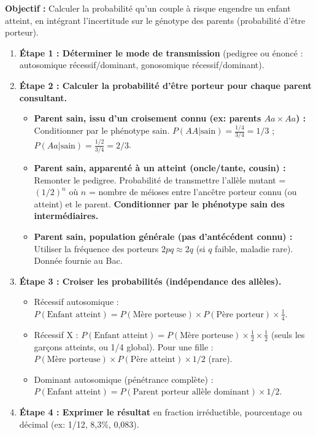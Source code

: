 \documentclass[11pt]{article}
\begin{document}
\begin{methode}
    \textbf{Objectif :} Calculer la probabilité qu'un couple à risque engendre un enfant atteint, en intégrant l'incertitude sur le génotype des parents (probabilité d'être porteur).
    \begin{enumerate}
        \item \textbf{Étape 1 : Déterminer le mode de transmission} (pedigree ou énoncé : autosomique récessif/dominant, gonosomique récessif/dominant).
        \item \textbf{Étape 2 : Calculer la probabilité d'être porteur pour chaque parent consultant.}
              \begin{itemize}
                  \item \textbf{Parent sain, issu d'un croisement connu (ex: parents $Aa \times Aa$) :} Conditionner par le phénotype sain.
                      $P(AA | \text{sain}) = \frac{1/4}{3/4} = 1/3$ ; $P(Aa | \text{sain}) = \frac{1/2}{3/4} = 2/3$.
                  \item \textbf{Parent sain, apparenté à un atteint (oncle/tante, cousin) :} Remonter le pedigree. Probabilité de transmettre l'allèle mutant = $(1/2)^n$ où $n$ = nombre de méioses entre l'ancêtre porteur connu (ou atteint) et le parent. \textbf{Conditionner par le phénotype sain des intermédiaires.}
                  \item \textbf{Parent sain, population générale (pas d'antécédent connu) :} Utiliser la fréquence des porteurs $2pq \approx 2q$ (si $q$ faible, maladie rare). Donnée fournie au Bac.
              \end{itemize}
        \item \textbf{Étape 3 : Croiser les probabilités (indépendance des allèles).}
              \begin{itemize}
                  \item Récessif autosomique : $P(\text{Enfant atteint}) = P(\text{Mère porteuse}) \times P(\text{Père porteur}) \times \frac{1}{4}$.
                  \item Récessif X : $P(\text{Enfant atteint}) = P(\text{Mère porteuse}) \times \frac{1}{2} \times \frac{1}{2}$ (seuls les garçons atteints, ou 1/4 global). Pour une fille : $P(\text{Mère porteuse}) \times P(\text{Père atteint}) \times 1/2$ (rare).
                  \item Dominant autosomique (pénétrance complète) : $P(\text{Enfant atteint}) = P(\text{Parent porteur allèle dominant}) \times 1/2$.
              \end{itemize}
        \item \textbf{Étape 4 : Exprimer le résultat} en fraction irréductible, pourcentage ou décimal (ex: 1/12, 8,3\%, 0,083).
    \end{enumerate}
\end{methode}
\end{document}
